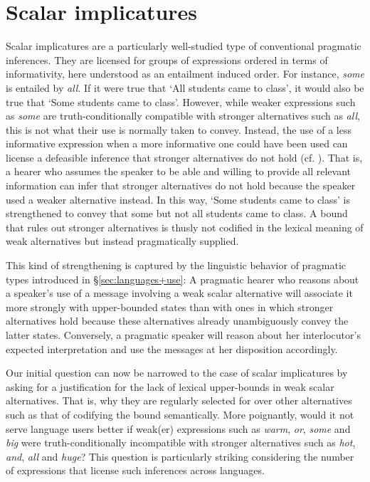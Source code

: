 \documentclass[a4paper]{article}
\begin{document}
\section{Scalar implicatures}\label{sec:si-case-study}
%
Scalar implicatures are a particularly well-studied type of conventional pragmatic inferences. They are licensed for groups of expressions ordered in terms of informativity, here understood as an entailment induced order. For instance, {\em some} is entailed by {\em all}. If it were true that `All students came to class', it would also be true that `Some students came to class'. However, while weaker expressions such as {\em some} are truth-conditionally compatible with stronger alternatives such as {\em all}, this is not what their use is normally taken to convey. Instead, the use of a less informative expression when a more informative one could have been used can license a defeasible inference that stronger alternatives do not hold (cf. \citealt{horn:1972,gazdar:1979}). That is, a hearer who assumes the speaker to be able and willing to provide all relevant information can infer that stronger alternatives do not hold because the speaker used a weaker alternative instead. In this way, `Some students came to class' is strengthened to convey that some but not all students came to class. A bound that rules out stronger alternatives is thusly not codified in the lexical meaning of weak alternatives but instead pragmatically supplied.

This kind of strengthening is captured by the linguistic behavior of pragmatic types introduced in \S\ref{sec:languages+use}: A pragmatic hearer who reasons about a speaker's use of a message involving a weak scalar alternative will associate it more strongly with upper-bounded states than with ones in which stronger alternatives hold because these alternatives already unambiguously convey the latter states. Conversely, a pragmatic speaker will reason about her interlocutor's expected interpretation and use the messages at her disposition accordingly. 

Our initial question can now be narrowed to the case of scalar implicatures by asking for a justification for the lack of lexical upper-bounds in weak scalar alternatives. That is, why they are regularly selected for over other alternatives such as that of codifying the bound semantically. More poignantly, would it not serve language users better if weak(er) expressions such as {\em warm}, {\em or}, {\em some} and {\em big} were truth-conditionally incompatible with stronger alternatives such as {\em hot}, {\em and}, {\em all} and {\em huge}?  This question is particularly striking considering the number of expressions that license such inferences across languages. 
\end{document}

